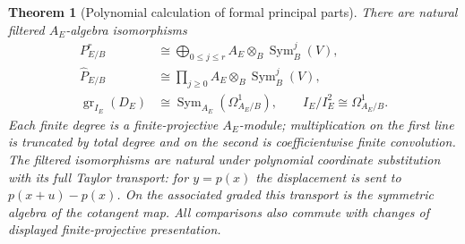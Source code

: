 \documentclass[11pt,a4paper]{article}
\numberwithin{algorithm}{section}
\numberwithin{equation}{section}
\newtheorem{theorem}{Theorem}[section]
\theoremstyle{definition}
\theoremstyle{remark}
\theoremstyle{plain}
\newcommand{\Sym}{\operatorname{Sym}}
\newcommand{\gr}{\operatorname{gr}}
\theoremstyle{definition}
\theoremstyle{plain}
\begin{document}
\begin{theorem}[Polynomial calculation of formal principal parts]
\label{thm:formal-principal-parts}
There are natural filtered $A_E$-algebra isomorphisms
\begin{equation}\label{eq:formal-principal-parts}
 \begin{aligned}
  P^r_{E/B}&\cong
    \bigoplus_{0\le j\le r}A_E\otimes_B\Sym_B^j(V),\\
  \widehat P_{E/B}&\cong
    \prod_{j\ge0}A_E\otimes_B\Sym_B^j(V),\\
  \gr_{I_E}(D_E)&\cong
    \Sym_{A_E}(\Omega^1_{A_E/B}),
    \qquad I_E/I_E^2\cong\Omega^1_{A_E/B}.
 \end{aligned}
\end{equation}
Each finite degree is a finite-projective $A_E$-module; multiplication
on the first line is truncated by total degree and on the second is
coefficientwise finite convolution.  The filtered isomorphisms are
natural under polynomial coordinate substitution with its full Taylor
transport: for $y=p(x)$ the displacement is sent to
$p(x+u)-p(x)$.  On the associated graded this transport is the
symmetric algebra of the cotangent map.  All comparisons also commute
with changes of displayed finite-projective presentation.
\end{theorem}
\end{document}
